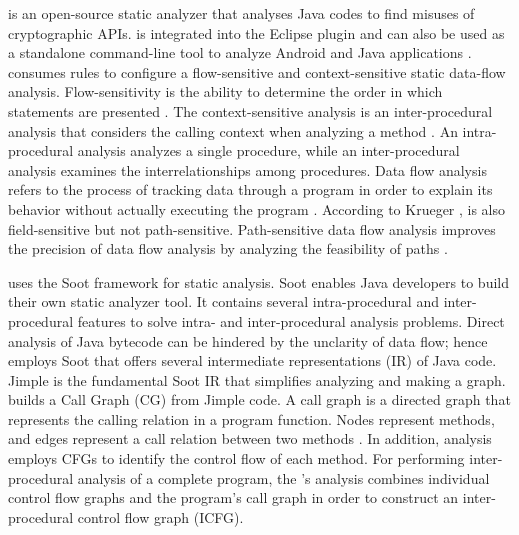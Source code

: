 \cognicryptsast{} \cite{stefanphd} is an open-source static analyzer that analyses Java codes to find misuses of cryptographic APIs. \cognicryptsast{} is integrated into the \cognicrypt{} Eclipse plugin and can also be used as a standalone command-line tool to analyze Android and Java applications \cite{cryptoanalysis}. \cognicryptsast{} consumes \crysl{} \cite{skm19} rules to configure a flow-sensitive and context-sensitive static data-flow analysis. Flow-sensitivity is the ability to determine the order in which statements are presented \cite{pointer}. The context-sensitive analysis is an inter-procedural analysis that considers the calling context when analyzing a method \cite{pointer}. An intra-procedural analysis analyzes a single procedure, while an inter-procedural analysis examines the interrelationships among procedures. Data flow analysis refers to the process of tracking data through a program in order to explain its behavior without actually executing the program \cite{johannesphd}. According to Krueger \cite{stefanphd}, \cognicryptsast{} is also field-sensitive but not path-sensitive. Path-sensitive data flow analysis improves the precision of data flow analysis by analyzing the feasibility of paths \cite{pathsensitive}.

\cognicryptsast{} uses the Soot framework \cite{soot} for static analysis. Soot enables Java developers to build their own static analyzer tool. It contains several intra-procedural and inter-procedural features to solve intra- and inter-procedural analysis problems. Direct analysis of Java bytecode can be hindered by the unclarity of data flow; hence \cognicryptsast{} employs Soot that offers several intermediate representations (IR) of Java code. Jimple is the fundamental Soot IR that simplifies analyzing and making a graph. \cognicryptsast{} builds a Call Graph (CG) from Jimple code. A call graph is a directed graph that represents the calling relation in a program function. Nodes represent methods, and edges represent a call relation between two methods \cite{callgraph}. In addition, analysis employs CFGs to identify the control flow of each method. For performing inter-procedural analysis of a complete program, the \cognicryptsast's analysis combines individual control flow graphs and the program's call graph in order to construct an inter-procedural control flow graph (ICFG).

